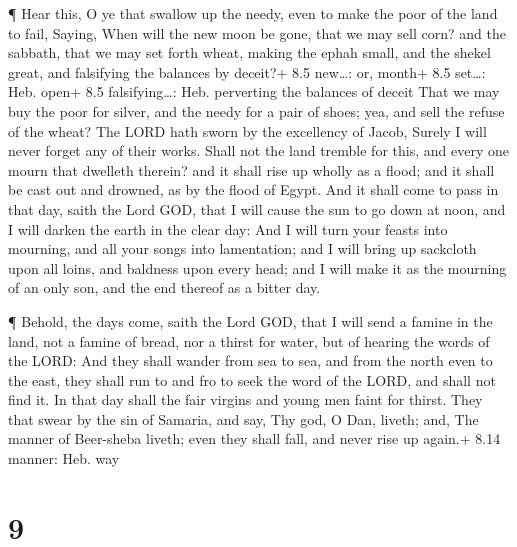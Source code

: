  ¶ Hear this, O ye that swallow up the needy, even to make
the poor of the land to fail,  Saying, When will the new
moon be gone, that we may sell corn? and the sabbath, that we may set
forth wheat, making the ephah small, and the shekel great, and
falsifying the balances by deceit?+ 8.5 new\ldots: or, month+ 8.5
set\ldots: Heb. open+ 8.5 falsifying\ldots: Heb. perverting the balances
of deceit  That we may buy the poor for silver, and the
needy for a pair of shoes; yea, and sell the refuse of the wheat?
 The LORD hath sworn by the excellency of Jacob, Surely I
will never forget any of their works.  Shall not the land
tremble for this, and every one mourn that dwelleth therein? and it
shall rise up wholly as a flood; and it shall be cast out and drowned,
as by the flood of Egypt.  And it shall come to pass in that
day, saith the Lord GOD, that I will cause the sun to go down at noon,
and I will darken the earth in the clear day:  And I will
turn your feasts into mourning, and all your songs into lamentation; and
I will bring up sackcloth upon all loins, and baldness upon every head;
and I will make it as the mourning of an only son, and the end thereof
as a bitter day.

 ¶ Behold, the days come, saith the Lord GOD, that I will
send a famine in the land, not a famine of bread, nor a thirst for
water, but of hearing the words of the LORD:  And they
shall wander from sea to sea, and from the north even to the east, they
shall run to and fro to seek the word of the LORD, and shall not find
it.  In that day shall the fair virgins and young men faint
for thirst.  They that swear by the sin of Samaria, and
say, Thy god, O Dan, liveth; and, The manner of Beer-sheba liveth; even
they shall fall, and never rise up again.+ 8.14 manner: Heb. way

\hypertarget{section-8}{%
\section{9}\label{section-8}}

